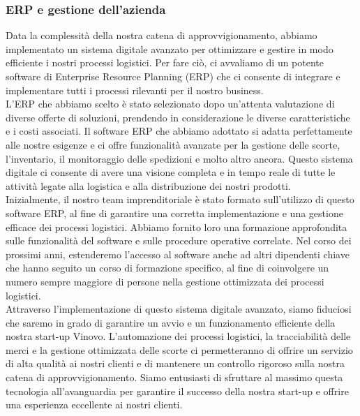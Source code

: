 \documentclass[12pt, a4paper]{article}
\newcommand{\meskip}{\medskip \\}
\begin{document}
\subsubsection{ERP e gestione dell'azienda}
Data la complessità della nostra catena di approvvigionamento, abbiamo implementato un sistema digitale avanzato per ottimizzare e gestire in modo efficiente i nostri processi logistici. Per fare ciò, ci avvaliamo di un potente software di Enterprise Resource Planning (ERP) che ci consente di integrare e implementare tutti i processi rilevanti per il nostro business.\meskip
L'ERP che abbiamo scelto è stato selezionato dopo un'attenta valutazione di diverse offerte di soluzioni, prendendo in considerazione le diverse caratteristiche e i costi associati. Il software ERP che abbiamo adottato si adatta perfettamente alle nostre esigenze e ci offre funzionalità avanzate per la gestione delle scorte, l'inventario, il monitoraggio delle spedizioni e molto altro ancora. Questo sistema digitale ci consente di avere una visione completa e in tempo reale di tutte le attività legate alla logistica e alla distribuzione dei nostri prodotti.\meskip
Inizialmente, il nostro team imprenditoriale è stato formato sull'utilizzo di questo software ERP, al fine di garantire una corretta implementazione e una gestione efficace dei processi logistici. Abbiamo fornito loro una formazione approfondita sulle funzionalità del software e sulle procedure operative correlate. Nel corso dei prossimi anni, estenderemo l'accesso al software anche ad altri dipendenti chiave che hanno seguito un corso di formazione specifico, al fine di coinvolgere un numero sempre maggiore di persone nella gestione ottimizzata dei processi logistici.\meskip
Attraverso l'implementazione di questo sistema digitale avanzato, siamo fiduciosi che saremo in grado di garantire un avvio e un funzionamento efficiente della nostra start-up Vinovo. L'automazione dei processi logistici, la tracciabilità delle merci e la gestione ottimizzata delle scorte ci permetteranno di offrire un servizio di alta qualità ai nostri clienti e di mantenere un controllo rigoroso sulla nostra catena di approvvigionamento. Siamo entusiasti di sfruttare al massimo questa tecnologia all'avanguardia per garantire il successo della nostra start-up e offrire una esperienza eccellente ai nostri clienti.
\end{document}
